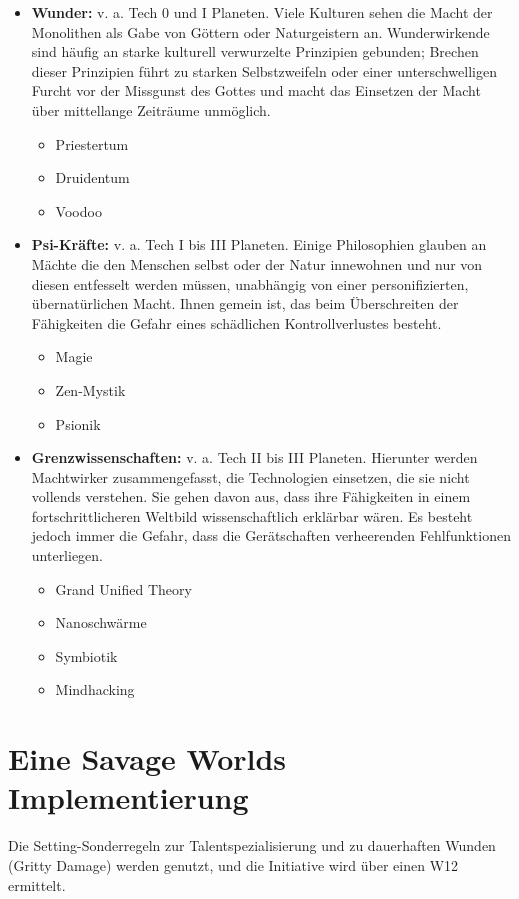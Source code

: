 \documentclass[10pt,a4paper]{report}
\begin{document}
\begin{itemize}
\item \textbf{Wunder:} v. a. Tech 0 und I Planeten. Viele Kulturen sehen die Macht der Monolithen als Gabe von Göttern oder Naturgeistern an. Wunderwirkende sind häufig an starke kulturell verwurzelte Prinzipien gebunden; Brechen dieser Prinzipien führt zu starken Selbstzweifeln oder einer unterschwelligen Furcht vor der Missgunst des Gottes und macht das Einsetzen der Macht über mittellange Zeiträume unmöglich.
\begin{itemize}
\item Priestertum
\item Druidentum
\item Voodoo
\end{itemize}
\item \textbf{Psi-Kräfte:} v. a. Tech I bis III Planeten. Einige Philosophien glauben an Mächte die den Menschen selbst oder der Natur innewohnen und nur von diesen entfesselt werden müssen, unabhängig von einer personifizierten, übernatürlichen Macht. Ihnen gemein ist, das beim Überschreiten der Fähigkeiten die Gefahr eines schädlichen Kontrollverlustes besteht.
\begin{itemize}
\item Magie
\item Zen-Mystik
\item Psionik
\end{itemize}
\item \textbf{Grenzwissenschaften:} v. a. Tech II bis III Planeten. Hierunter werden Machtwirker zusammengefasst, die Technologien einsetzen, die sie nicht vollends verstehen. Sie gehen davon aus, dass ihre Fähigkeiten in einem fortschrittlicheren Weltbild wissenschaftlich erklärbar wären. Es besteht jedoch immer die Gefahr, dass die Gerätschaften verheerenden Fehlfunktionen unterliegen.
\begin{itemize}
\item Grand Unified Theory
\item Nanoschwärme
\item Symbiotik
\item Mindhacking
\end{itemize}
\end{itemize}

\onecolumn
\chapter{Eine Savage Worlds Implementierung}
Die Setting-Sonderregeln zur Talentspezialisierung und zu dauerhaften Wunden (Gritty Damage) werden genutzt, und die Initiative wird über einen W12 ermittelt.
\end{document}
